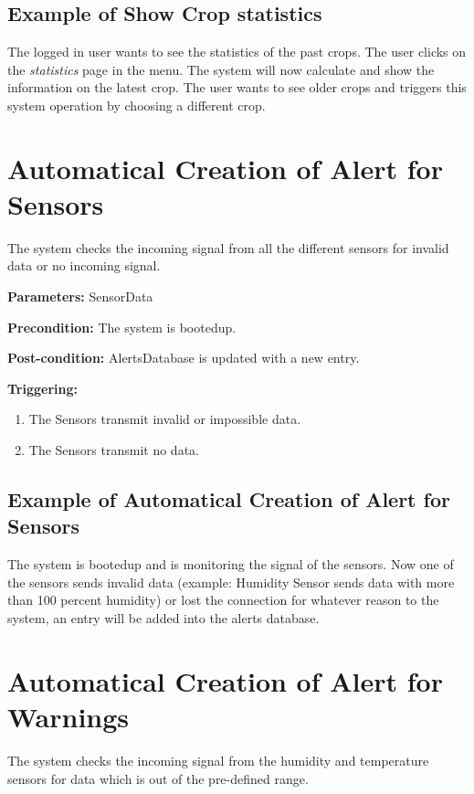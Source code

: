 \subsection{Example of Show Crop statistics}
The logged in user wants to see the statistics of the past crops.
The user clicks on the \emph{statistics} page in the menu.
The system will now calculate and show the information on the latest crop.
The user wants to see older crops and triggers this system operation by choosing
a different crop.



\section{Automatical Creation of Alert for Sensors}
\label{operation:AddAlertForSensors}
The system checks the incoming signal from all the different sensors for invalid
data or no incoming signal.

\begin{description}

\item \textbf{Parameters:} SensorData
\item \textbf{Precondition:} The system is bootedup.
\item \textbf{Post-condition:} AlertsDatabase is updated with a new entry.

\item \textbf{Triggering:}
\begin{enumerate}
\item The Sensors transmit invalid or impossible data.
\item The Sensors transmit no data.
\end{enumerate}
\end{description}

\subsection{Example of Automatical Creation of Alert for Sensors}
The system is bootedup and is monitoring the signal of the sensors.
Now one of the sensors sends invalid data (example: Humidity Sensor sends data
with more than 100 percent humidity) or lost the connection for whatever reason
to the system, an entry will be added into the alerts database.




\section{Automatical Creation of Alert for Warnings}
\label{operation:AddAlertForWarnigns}
The system checks the incoming signal from the humidity and temperature sensors
for data which is out of the pre-defined range.

